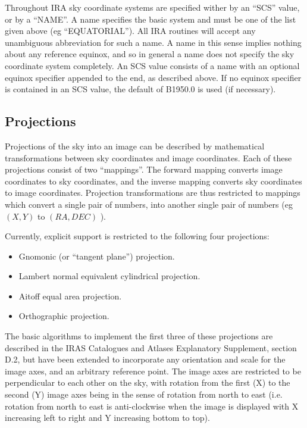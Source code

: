 Throughout IRA sky coordinate systems are specified wither by an ``SCS'' value,
or by a ``NAME''. A name specifies the basic system and must be one of the list
given above (eg ``EQUATORIAL''). All IRA routines will accept any unambiguous
abbreviation for such a name. A name in this sense implies nothing about any
reference equinox, and so in general a name does not specify the sky coordinate
system completely. An SCS value consists of a name with an optional equinox
specifier appended to the end, as described above. If no equinox specifier is
contained in an SCS value, the default of B1950.0 is used (if necessary). 

\subsection {Projections}
\label {SEC:PARS}
Projections of the sky into an image can be described by mathematical
transformations between sky coordinates and image coordinates. Each of these
projections consist of two ``mappings''. The forward mapping converts image
coordinates to sky coordinates, and the inverse mapping converts sky coordinates
to image coordinates. Projection transformations are thus restricted to mappings
which convert a single pair of numbers, into another single pair of numbers (eg
$(X,Y)$ to $(RA,DEC)$ ). 

Currently, explicit support is restricted to the following four projections:
\begin {itemize}
\item Gnomonic (or ``tangent plane'') projection.
\item Lambert normal equivalent cylindrical projection.
\item Aitoff equal area projection.
\item Orthographic projection.
\end {itemize}
The basic algorithms to implement the first three of these projections are
described in the IRAS Catalogues and Atlases Explanatory Supplement, section
D.2, but have been extended to incorporate any orientation and scale for the
image axes, and an arbitrary reference point. The image axes are restricted to 
be perpendicular to each other on the sky, with rotation from the first (X) to 
the second (Y) image axes being in the sense of rotation from north to east 
(i.e. rotation from north to east is anti-clockwise when the image is displayed 
with X increasing left to right and Y increasing bottom to top).

